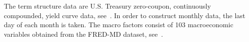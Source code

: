 The term structure data are U.S. Treasury zero-coupon, continuously compounded, yield curve data, see~\cite{Grkaynak2007}. In order to construct monthly data, the last day of each month is taken. 
The macro factors consist of 103 macroeconomic variables obtained from the FRED-MD dataset, see~\cite{McCracken2016}.